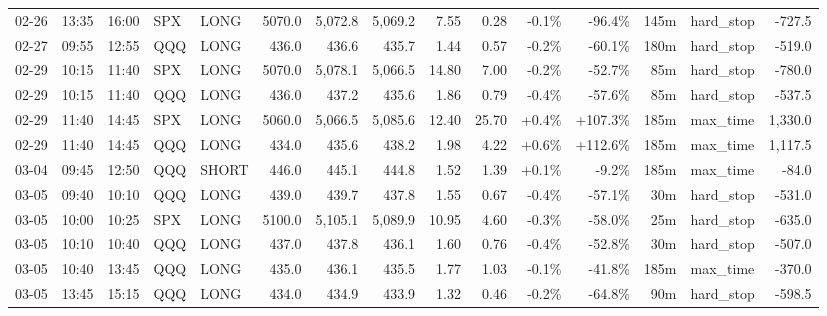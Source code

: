 \documentclass[11pt,a4paper,twoside]{article}
\begin{document}
\begin{landscape}
\begin{center}
\begin{longtable}{>{\color{txtmain}}l l l l l r r r r r r r r >{\color{txtmain}}l r}
02-26 & 13:35 & 16:00 & SPX & LONG & 5070.0 & 5,072.8 & 5,069.2 & 7.55 & 0.28 & \textcolor{lossred}{-0.1\%} & \textcolor{lossred}{-96.4\%} & 145m & hard\_stop & \textcolor{lossred}{-727.5} \\
02-27 & 09:55 & 12:55 & QQQ & LONG & 436.0 & 436.6 & 435.7 & 1.44 & 0.57 & \textcolor{lossred}{-0.2\%} & \textcolor{lossred}{-60.1\%} & 180m & hard\_stop & \textcolor{lossred}{-519.0} \\
02-29 & 10:15 & 11:40 & SPX & LONG & 5070.0 & 5,078.1 & 5,066.5 & 14.80 & 7.00 & \textcolor{lossred}{-0.2\%} & \textcolor{lossred}{-52.7\%} & 85m & hard\_stop & \textcolor{lossred}{-780.0} \\
02-29 & 10:15 & 11:40 & QQQ & LONG & 436.0 & 437.2 & 435.6 & 1.86 & 0.79 & \textcolor{lossred}{-0.4\%} & \textcolor{lossred}{-57.6\%} & 85m & hard\_stop & \textcolor{lossred}{-537.5} \\
02-29 & 11:40 & 14:45 & SPX & LONG & 5060.0 & 5,066.5 & 5,085.6 & 12.40 & 25.70 & \textcolor{wingreen}{+0.4\%} & \textcolor{wingreen}{+107.3\%} & 185m & max\_time & \textcolor{wingreen}{1,330.0} \\
02-29 & 11:40 & 14:45 & QQQ & LONG & 434.0 & 435.6 & 438.2 & 1.98 & 4.22 & \textcolor{wingreen}{+0.6\%} & \textcolor{wingreen}{+112.6\%} & 185m & max\_time & \textcolor{wingreen}{1,117.5} \\
03-04 & 09:45 & 12:50 & QQQ & SHORT & 446.0 & 445.1 & 444.8 & 1.52 & 1.39 & \textcolor{wingreen}{+0.1\%} & \textcolor{lossred}{-9.2\%} & 185m & max\_time & \textcolor{lossred}{-84.0} \\
03-05 & 09:40 & 10:10 & QQQ & LONG & 439.0 & 439.7 & 437.8 & 1.55 & 0.67 & \textcolor{lossred}{-0.4\%} & \textcolor{lossred}{-57.1\%} & 30m & hard\_stop & \textcolor{lossred}{-531.0} \\
03-05 & 10:00 & 10:25 & SPX & LONG & 5100.0 & 5,105.1 & 5,089.9 & 10.95 & 4.60 & \textcolor{lossred}{-0.3\%} & \textcolor{lossred}{-58.0\%} & 25m & hard\_stop & \textcolor{lossred}{-635.0} \\
03-05 & 10:10 & 10:40 & QQQ & LONG & 437.0 & 437.8 & 436.1 & 1.60 & 0.76 & \textcolor{lossred}{-0.4\%} & \textcolor{lossred}{-52.8\%} & 30m & hard\_stop & \textcolor{lossred}{-507.0} \\
03-05 & 10:40 & 13:45 & QQQ & LONG & 435.0 & 436.1 & 435.5 & 1.77 & 1.03 & \textcolor{lossred}{-0.1\%} & \textcolor{lossred}{-41.8\%} & 185m & max\_time & \textcolor{lossred}{-370.0} \\
03-05 & 13:45 & 15:15 & QQQ & LONG & 434.0 & 434.9 & 433.9 & 1.32 & 0.46 & \textcolor{lossred}{-0.2\%} & \textcolor{lossred}{-64.8\%} & 90m & hard\_stop & \textcolor{lossred}{-598.5} \\

\end{longtable}
\end{center}
\end{landscape}
\end{document}
